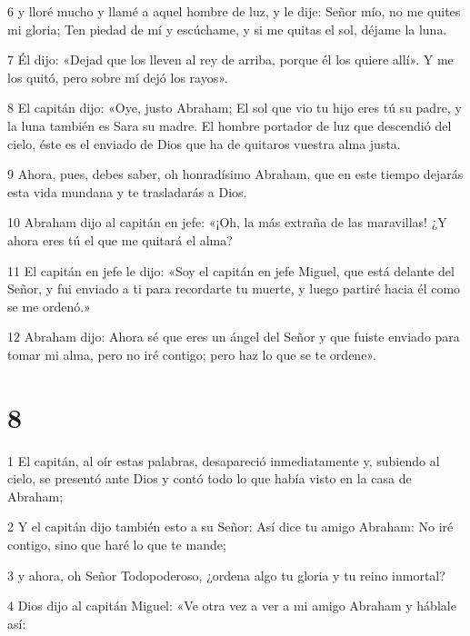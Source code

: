 \par 6 y lloré mucho y llamé a aquel hombre de luz, y le dije: Señor mío, no me quites mi gloria; Ten piedad de mí y escúchame, y si me quitas el sol, déjame la luna.

\par 7 Él dijo: «Dejad que los lleven al rey de arriba, porque él los quiere allí». Y me los quitó, pero sobre mí dejó los rayos».

\par 8 El capitán dijo: «Oye, justo Abraham; El sol que vio tu hijo eres tú su padre, y la luna también es Sara su madre. El hombre portador de luz que descendió del cielo, éste es el enviado de Dios que ha de quitaros vuestra alma justa.

\par 9 Ahora, pues, debes saber, oh honradísimo Abraham, que en este tiempo dejarás esta vida mundana y te trasladarás a Dios.

\par 10 Abraham dijo al capitán en jefe: «¡Oh, la más extraña de las maravillas! ¿Y ahora eres tú el que me quitará el alma?

\par 11 El capitán en jefe le dijo: «Soy el capitán en jefe Miguel, que está delante del Señor, y fui enviado a ti para recordarte tu muerte, y luego partiré hacia él como se me ordenó.»

\par 12 Abraham dijo: Ahora sé que eres un ángel del Señor y que fuiste enviado para tomar mi alma, pero no iré contigo; pero haz lo que se te ordene».

\chapter{8}

\par 1 El capitán, al oír estas palabras, desapareció inmediatamente y, subiendo al cielo, se presentó ante Dios y contó todo lo que había visto en la casa de Abraham;

\par 2 Y el capitán dijo también esto a su Señor: Así dice tu amigo Abraham: No iré contigo, sino que haré lo que te mande;

\par 3 y ahora, oh Señor Todopoderoso, ¿ordena algo tu gloria y tu reino inmortal?

\par 4 Dios dijo al capitán Miguel: «Ve otra vez a ver a mi amigo Abraham y háblale así:

